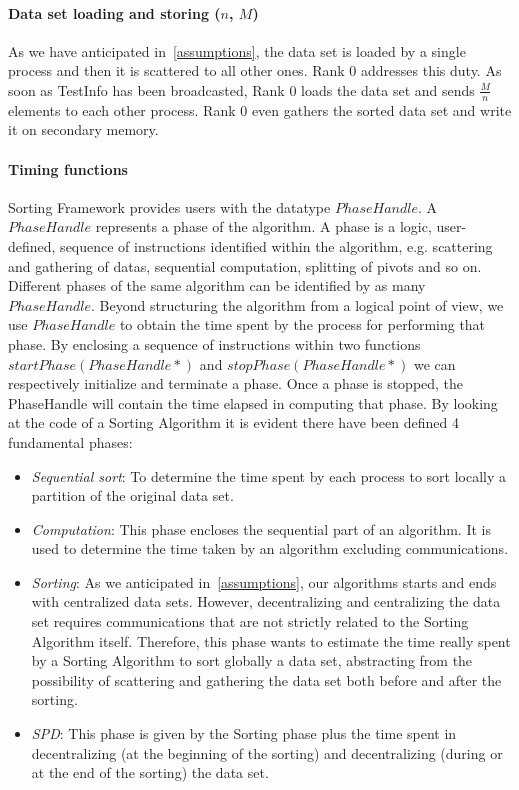 \paragraph{Data set loading and storing ($n$, $M$)} As we have anticipated in~\ref{assumptions}, the data set is loaded by a single process and then it is scattered to all other ones. Rank $0$ addresses this duty. As soon as TestInfo has been broadcasted, Rank $0$ loads the data set and sends $\frac{M}{n}$ elements to each other process. Rank $0$ even gathers the sorted data set and write it on secondary memory.

\paragraph{Timing functions} Sorting Framework provides users with the datatype $PhaseHandle$. A $PhaseHandle$ represents a phase of the algorithm. A phase is a logic, user-defined, sequence of instructions identified within the algorithm,  e.g. scattering and gathering of datas, sequential computation, splitting of pivots and so on. Different phases of the same algorithm can be identified by as many $PhaseHandle$. Beyond structuring the algorithm from a logical point of view, we use $PhaseHandle$ to obtain the time spent by the process for performing that phase. By enclosing a sequence of instructions within two functions $startPhase(PhaseHandle*)$ and $stopPhase(PhaseHandle*)$ we can respectively initialize and terminate a phase. Once a phase is stopped, the PhaseHandle will contain the time elapsed in computing that phase. By looking at the code of a Sorting Algorithm it is evident there have been defined 4 fundamental phases: 
\begin{itemize}
\item \textit{Sequential sort}: To determine the time spent by each process to sort locally a partition of the original data set. 
\item \textit{Computation}: This phase encloses the sequential part of an algorithm. It is used to determine the time taken by an algorithm excluding communications.
\item \textit{Sorting}: As we anticipated in~\ref {assumptions}, our algorithms starts and ends with centralized data sets. However, decentralizing and centralizing the data set requires communications that are not strictly related to the Sorting Algorithm itself. Therefore, this phase wants to estimate the time really spent by a Sorting Algorithm to sort globally a data set, abstracting from the possibility of scattering and gathering the data set both before and after the sorting.
\item \textit{SPD}: This phase is given by the Sorting phase plus the time spent in decentralizing (at the beginning of the sorting) and decentralizing (during or at the end of the sorting) the data set.
\end{itemize}
